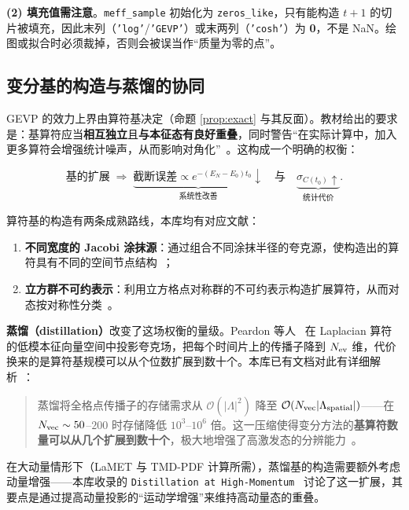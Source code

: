\documentclass[12pt,a4paper]{ctexart}
\theoremstyle{definition}
\newcommand{\Order}{\mathcal{O}}
\newcommand{\code}[1]{\texttt{#1}}
\begin{document}
\textbf{(2) 填充值需注意}。\code{meff\_sample} 初始化为 \code{zeros\_like}，只有能构造 $t+1$ 的切片被填充，因此末列（\code{'log'}/\code{'GEVP'}）或末两列（\code{'cosh'}）为 \textbf{0}，不是 NaN。绘图或拟合时必须裁掉，否则会被误当作``质量为零的点''。

\subsection{变分基的构造与蒸馏的协同}\label{subsec:basis}

GEVP 的效力上界由算符基决定（命题 \ref{prop:exact} 与其反面）。教材给出的要求是：基算符应当\textbf{相互独立}且\textbf{与本征态有良好重叠}，同时警告``在实际计算中，加入更多算符会增强统计噪声，从而影响对角化''~\cite{GattringerLang2010}。这构成一个明确的权衡：

\begin{equation}
\text{基的扩展} \;\Longrightarrow\; \underbrace{\text{截断误差}\propto e^{-(E_N-E_0)t_0}\downarrow}_{\text{系统性改善}}
\quad\text{与}\quad
\underbrace{\sigma_{C(t_0)}\uparrow}_{\text{统计代价}} .
\label{eq:tradeoff}
\end{equation}

算符基的构造有两条成熟路线，本库均有对应文献：

\begin{enumerate}[nosep]
    \item \textbf{不同宽度的 Jacobi 涂抹源}：通过组合不同涂抹半径的夸克源，使构造出的算符具有不同的空间节点结构~\cite{GattringerLang2010}；
    \item \textbf{立方群不可约表示}：利用立方格点对称群的不可约表示构造扩展算符，从而对态按对称性分类~\cite{GattringerLang2010}。
\end{enumerate}

\textbf{蒸馏（distillation）}改变了这场权衡的量级。Peardon 等人~\cite{Distillation2009} 在 Laplacian 算符的低模本征向量空间中投影夸克场，把每个时间片上的传播子降到 $N_{\rm ev}$ 维，代价换来的是算符基规模可以从个位数扩展到数十个。本库已有文档对此有详细解析~\cite{propagatorDoc2026}：

\begin{quote}
蒸馏将全格点传播子的存储需求从 $\Order(|\Lambda|^2)$ 降至 $\Order(N_{\rm vec}|\Lambda_{\rm spatial}|)$——在 $N_{\rm vec}\sim50$--$200$ 时存储降低 $10^3$--$10^6$ 倍。这一压缩使得变分方法的\textbf{基算符数量可以从几个扩展到数十个}，极大地增强了高激发态的分辨能力~\cite{propagatorDoc2026}。
\end{quote}

在大动量情形下（LaMET 与 TMD-PDF 计算所需），蒸馏基的构造需要额外考虑动量增强——本库收录的 \code{Distillation at High-Momentum}~\cite{Egerer2021a} 讨论了这一扩展，其要点是通过提高动量投影的``运动学增强''来维持高动量态的重叠。
\end{document}
